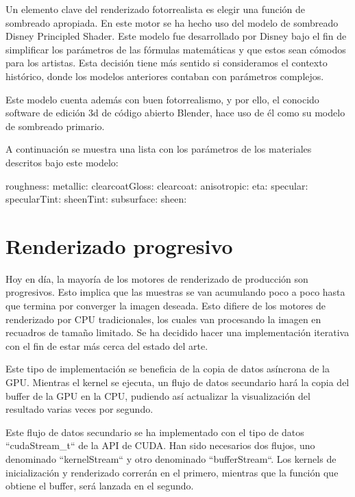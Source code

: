 	Un elemento clave del renderizado fotorrealista es elegir una función de sombreado apropiada. En este motor se ha hecho uso del modelo de sombreado Disney Principled Shader. Este modelo fue desarrollado por Disney bajo el fin de simplificar los parámetros de las fórmulas matemáticas y que estos sean cómodos para los artistas. Esta decisión tiene más sentido si consideramos el contexto histórico, donde los modelos anteriores contaban con parámetros complejos.

	Este modelo cuenta además con buen fotorrealismo, y por ello, el conocido software de edición 3d de código abierto Blender, hace uso de él como su modelo de sombreado primario.


	A continuación se muestra una lista con los parámetros de los materiales descritos bajo este modelo:

	roughness:
	metallic:
	clearcoatGloss:
	clearcoat:
	anisotropic:
	eta:
	specular:
	specularTint:
	sheenTint:
	subsurface:
	sheen:


	
	\section{Renderizado progresivo}
		
	Hoy en día, la mayoría de los motores de renderizado de producción son progresivos. Esto implica que las muestras se van acumulando poco a poco hasta que termina por converger la imagen deseada. Esto difiere de los motores de renderizado por CPU tradicionales, los cuales van procesando la imagen en recuadros de tamaño limitado. Se ha decidido hacer una implementación iterativa con el fin de estar más cerca del estado del arte.



	Este tipo de implementación se beneficia de la copia de datos asíncrona de la GPU. Mientras el kernel se ejecuta, un flujo de datos secundario hará la copia del buffer de la GPU en la CPU, pudiendo así actualizar la visualización del resultado varias veces por segundo.

	Este flujo de datos secundario se ha implementado con el tipo de datos ``cudaStream\_t`` de la API de CUDA. Han sido necesarios dos flujos, uno denominado ``kernelStream`` y otro denominado ``bufferStream``. Los kernels de inicialización y renderizado correrán en el primero, mientras que la función que obtiene el buffer, será lanzada en el segundo.
